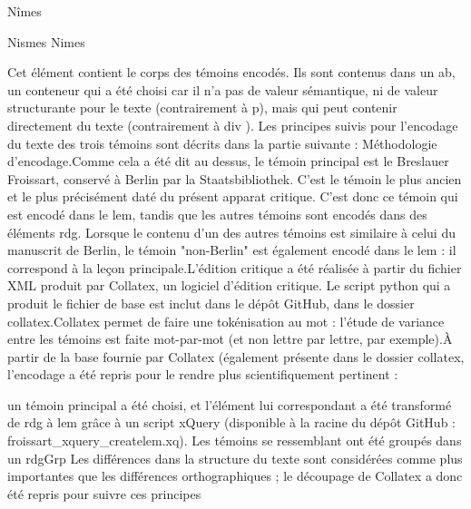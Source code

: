 \documentclass[12pt, a4paper]{article}
\begin{document}
                                 
                                    Nîmes
                                    
                                       
                                          Nismes
                                          Nimes
                                       
                                    
                                 
                              
                           
                        
                     Cet élément contient le corps des témoins encodés. Ils sont contenus dans un ab, un conteneur qui a été choisi car il n'a 
                     pas de valeur sémantique, ni de valeur structurante pour le texte (contrairement à p), mais qui peut contenir directement du 
                     texte (contrairement à div ). Les principes suivis pour l'encodage du texte des trois témoins sont décrits dans la partie suivante :
                     Méthodologie d'encodage.Comme cela a été dit au dessus, le témoin principal est le Breslauer Froissart, conservé à Berlin par la Staatsbibliothek.
                     C'est le témoin le plus ancien et le plus précisément daté du présent apparat critique. C'est donc ce témoin qui est encodé dans le lem, tandis que les autres
                     témoins sont encodés dans des éléments rdg. Lorsque le contenu d'un des autres témoins est similaire à celui du manuscrit de Berlin, le témoin "non-Berlin" est
                     également encodé dans le lem : il correspond à la leçon principale.L'édition critique a été réalisée à partir du fichier XML produit par Collatex, un logiciel d'édition critique. Le script python
                        qui a produit le fichier de base est inclut dans le dépôt GitHub, dans le dossier collatex.Collatex permet de faire une tokénisation au mot : l'étude de variance entre les témoins est faite mot-par-mot (et non lettre par lettre, par
                        exemple).À partir de la base fournie par Collatex (également présente dans le dossier collatex, l'encodage a été repris pour le rendre plus scientifiquement pertinent : 
                        
                           un témoin principal a été choisi, et l'élément lui correspondant a été transformé de rdg à lem grâce à un script xQuery (disponible à la racine du dépôt
                              GitHub : froissart_xquery_createlem.xq).
                           Les témoins se ressemblant ont été groupés dans un rdgGrp
                           Les différences dans la structure du texte sont considérées comme plus importantes que les différences orthographiques ; le découpage de Collatex
                              a donc été repris pour suivre ces principes
                        
\end{document}
